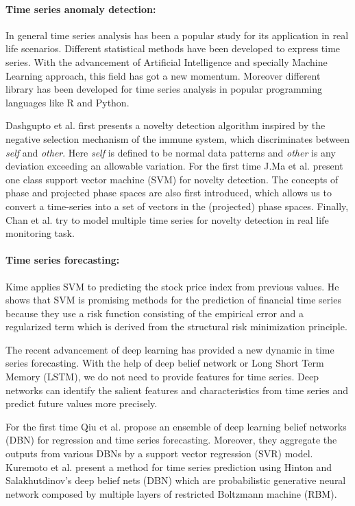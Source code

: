 \paragraph{\textbf{Time series anomaly detection:}} 
In general time series analysis has been a popular study for its application in real life scenarios. Different statistical methods have been developed to express time series. With the advancement of Artificial Intelligence and specially Machine Learning approach, this field has got a new momentum. Moreover different library has been developed for time series analysis in popular programming languages like R and Python. 

Dashgupto et al.\cite{immunology} first presents a
novelty detection algorithm inspired by the negative selection mechanism of the immune system, which discriminates between \textit{self} and \textit{other}. Here \textit{self} is defined
to be normal data patterns and \textit{other} is any deviation exceeding an allowable variation. For the first time J.Ma et al.\cite{svm} present one class support vector machine (SVM) for novelty detection. The concepts of phase and
projected phase spaces are also first introduced, which allows us to
convert a time-series into a set of vectors in the (projected)
phase spaces. Finally, Chan et al.\cite{multiple} try to model multiple time series for novelty detection in real life monitoring task.

\paragraph{\textbf{Time series forecasting:}}  
Kime\cite{financial} applies SVM to
predicting the stock price index from previous values. He shows that SVM is promising methods for the prediction of financial time series because they use a risk function consisting of the empirical error and a regularized term
which is derived from the structural risk minimization principle. 

The recent advancement of deep learning has provided a new dynamic in time series forecasting. With the help of deep belief network or Long Short Term Memory (LSTM), we do not need to provide features for time series. Deep networks can identify the salient features and characteristics from time series and predict future values more precisely. 

For the first time Qiu et al.\cite{deep learning} propose an ensemble of deep
learning belief networks (DBN)  for regression and
time series forecasting. Moreover, they aggregate
the outputs from various DBNs by a support vector regression
(SVR) model. Kuremoto et al.\cite{boltzman} present a
method for time series prediction using Hinton and Salakhutdinov's deep belief nets (DBN) which are
probabilistic generative neural network composed by multiple layers of restricted Boltzmann machine
(RBM).